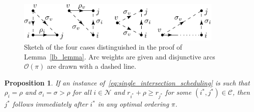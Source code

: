 \documentclass[a4paper]{article}
\theoremstyle{definition}
\theoremstyle{plain}
\newtheorem{proposition}{Proposition}
\begin{document}
\begin{figure}
  \centering
  \includegraphics[width=0.9\textwidth]{figures/lower-bound-lemma.pdf}
  \caption{Sketch of the four cases distinguished in the proof of
    Lemma~\ref{lb_lemma}. Arc weights are given and disjunctive arcs
    $\mathcal{O}(\pi)$ are drawn with a dashed line.}\label{fig:lb_lemma}
\end{figure}


\begin{proposition}\label{prop:exhaustive}
  If an instance of~\eqref{eq:single_intersection_scheduling} is such that $\rho_{i} = \rho$ and $\sigma_{i} = \sigma > \rho$ for all
  $i \in \mathcal{N}$ and $r_{i^{*}} + \rho \geq r_{j^{*}}$ for some
  $(i^{*},j^{*}) \in \mathcal{C}$, then $j^{*}$ follows immediately after $i^{*}$
  in any optimal ordering $\pi$.
\end{proposition}
\end{document}
